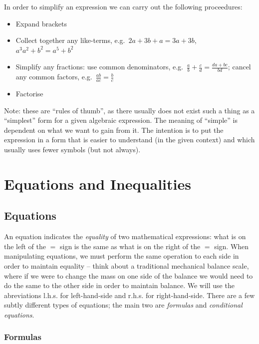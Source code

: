 \documentclass[
]{book}
\providecommand{\tightlist}{%
  \setlength{\itemsep}{0pt}\setlength{\parskip}{0pt}}
\theoremstyle{definition}
\theoremstyle{definition}
\theoremstyle{definition}
\theoremstyle{definition}
\theoremstyle{remark}
\begin{document}
In order to simplify an expression we can carry out the following proceedures:

\begin{itemize}
\tightlist
\item
  Expand brackets
\item
  Collect together any like-terms, e.g.~\(2a+3b+a=3a+3b\), \(a^3a^2+b^2=a^5+b^2\)
\item
  Simplify any fractions: use common denominators, e.g.~\(\frac{a}{b}+\frac{c}{d}=\frac{da+bc}{bd}\); cancel any common factors, e.g.~\(\frac{ab}{ac}=\frac{b}{c}\)
\item
  Factorise
\end{itemize}

Note: these are ``rules of thumb'', as there usually does not exist such a thing as a ``simplest'' form for a given algebraic expression. The meaning of ``simple'' is dependent on what we want to gain from it. The intention is to put the expression in a form that is easier to understand (in the given context) and which usually uses fewer symbols (but not always).

\hypertarget{equations-and-inequalities}{%
\chapter{Equations and Inequalities}\label{equations-and-inequalities}}

\hypertarget{equations}{%
\section{Equations}\label{equations}}

An equation indicates the \emph{equality} of two mathematical expressions: what is on the left of the \(=\) sign is the same as what is on the right of the \(=\) sign. When manipulating equations, we must perform the same operation to each side in order to maintain equality -- think about a traditional mechanical balance scale, where if we were to change the mass on one side of the balance we would need to do the same to the other side in order to maintain balance. We will use the abreviations l.h.s. for left-hand-side and r.h.s. for right-hand-side. There are a few subtly different types of equations; the main two are \emph{formulas} and \emph{conditional equations}.

\hypertarget{formulas}{%
\subsection{Formulas}\label{formulas}}
\end{document}
